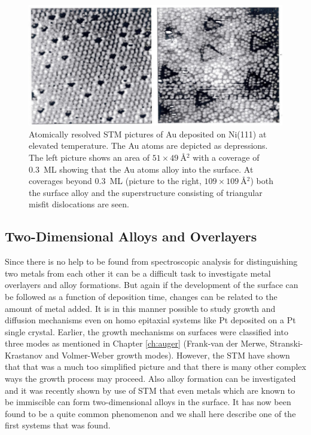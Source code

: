 \begin{figure}[h!]
	\begin{center}
	\includegraphics[scale=4]{figures/10_12.png}
	\caption{Atomically resolved STM pictures of Au deposited on Ni(111) at elevated temperature. The Au atoms are depicted as depressions. The left picture shows an area of $51\times \SI{49}{\angstrom^2}$ with a coverage of \SI{0.3}{ML} showing that the Au atoms alloy into the surface. At coverages beyond \SI{0.3}{ML} (picture to the right, $109\times \SI{109}{\angstrom^2}$) both the surface alloy and the superstructure consisting of triangular misfit dislocations are seen.}
	\label{fig:ocustm2}
	\end{center}
\end{figure}

\subsection{Two-Dimensional Alloys and Overlayers}
Since there is no help to be found from spectroscopic analysis for distinguishing two metals from each other it can be a difficult task to investigate metal overlayers and alloy formations. But again if the development of the surface can be followed as a function of deposition time, changes can be related to the amount of metal added. It is in this manner possible to study growth and diffusion mechanisms even on homo epitaxial systems like Pt deposited on a Pt single crystal. Earlier, the  growth mechanisms on surfaces were classified into  three modes as  mentioned  in Chapter \ref{ch:auger} (Frank-van der Merwe, Stranski-Krastanov and Volmer-Weber growth modes). However, the STM have shown that that was a much too simplified picture and that there is many other complex ways the growth process may proceed. Also alloy formation can be investigated and it was recently shown by use of STM that even metals which are known to be immiscible can form two-dimensional alloys in the surface. It has now been found to be a quite common phenomenon \cite{Besenbacher2} and we shall here describe  one of the first systems that was found.


